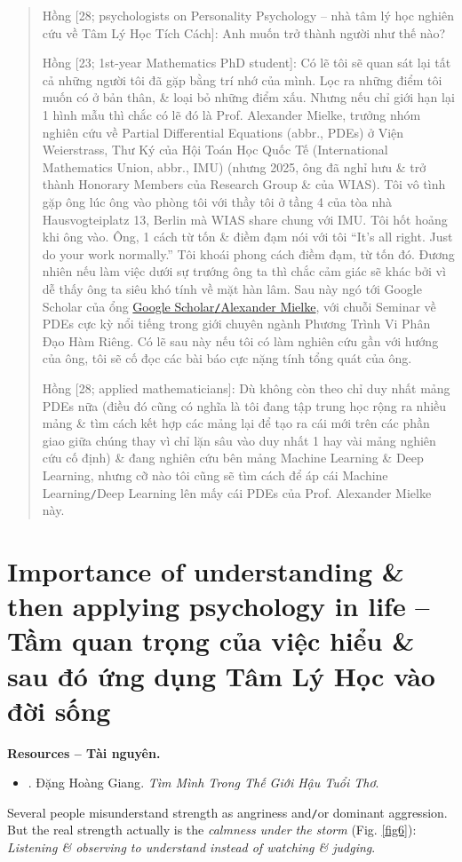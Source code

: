 \documentclass[12pt,oneside]{book}
\begin{document}
\begin{quote}
	{\sf Hồng [28; psychologists on Personality Psychology -- nhà tâm lý học nghiên cứu về Tâm Lý Học Tích Cách]}: Anh muốn trở thành người như thế nào?
	
	{\sf Hồng [23; 1st-year Mathematics PhD student]}: Có lẽ tôi sẽ quan sát lại tất cả những người tôi đã gặp bằng trí nhớ của mình. Lọc ra những điểm tôi muốn có ở bản thân, \& loại bỏ những điểm xấu. Nhưng nếu chỉ giới hạn lại 1 hình mẫu thì chắc có lẽ đó là Prof. {\sc Alexander Mielke}, trưởng nhóm nghiên cứu về Partial Differential Equations (abbr., PDEs) ở Viện Weierstrass, Thư Ký của Hội Toán Học Quốc Tế (International Mathematics Union, abbr., IMU) (nhưng 2025, ông đã nghỉ hưu \& trở thành Honorary Members của Research Group \& của WIAS). Tôi vô tình gặp ông lúc ông vào phòng tôi với thầy tôi ở tầng 4 của tòa nhà Hausvogteiplatz 13, Berlin mà WIAS share chung với IMU. Tôi hốt hoảng khi ông vào. Ông, 1 cách từ tốn \& điềm đạm nói với tôi ``It's all right. Just do your work normally.'' Tôi khoái phong cách điềm đạm, từ tốn đó. Đương nhiên nếu làm việc dưới sự trướng ông ta thì chắc cảm giác sẽ khác bởi vì dễ thấy ông ta siêu khó tính về mặt hàn lâm. Sau này ngó tới Google Scholar của ổng \href{https://scholar.google.com/citations?hl=en&user=G0GqC2sAAAAJ&view_op=list_works}{Google Scholar{\tt/}{\sc Alexander Mielke}}, với chuỗi Seminar về PDEs cực kỳ nổi tiếng trong giới chuyên ngành Phương Trình Vi Phân Đạo Hàm Riêng. Có lẽ sau này nếu tôi có làm nghiên cứu gần với hướng của ông, tôi sẽ cố đọc các bài báo cực nặng tính tổng quát của ông.
	
	{\sf Hồng [28; applied mathematicians]}: Dù không còn theo chỉ duy nhất mảng PDEs nữa (điều đó cũng có nghĩa là tôi đang tập trung học rộng ra nhiều mảng \& tìm cách kết hợp các mảng lại để tạo ra cái mới trên các phần giao giữa chúng thay vì chỉ lặn sâu vào duy nhất 1 hay vài mảng nghiên cứu cố định) \& đang nghiên cứu bên mảng Machine Learning \& Deep Learning, nhưng cỡ nào tôi cũng sẽ tìm cách để áp cái Machine Learning{\tt/}Deep Learning lên mấy cái PDEs của Prof. {\sc Alexander Mielke} này.
\end{quote}

\section{Importance of understanding \& then applying psychology in life -- Tầm quan trọng của việc hiểu \& sau đó ứng dụng Tâm Lý Học vào đời sống}
\textbf{\textsf{Resources -- Tài nguyên.}}
\begin{itemize}
	\item \cite{Giang_after_childhood}. {\sc Đặng Hoàng Giang}. {\it Tìm Mình Trong Thế Giới Hậu Tuổi Thơ}.
\end{itemize}
Several people misunderstand strength as angriness and{\tt/}or dominant aggression. But the real strength actually is the {\it calmness under the storm} (Fig. \ref{fig6}): {\it Listening \& observing to understand instead of watching \& judging}.
\end{document}
